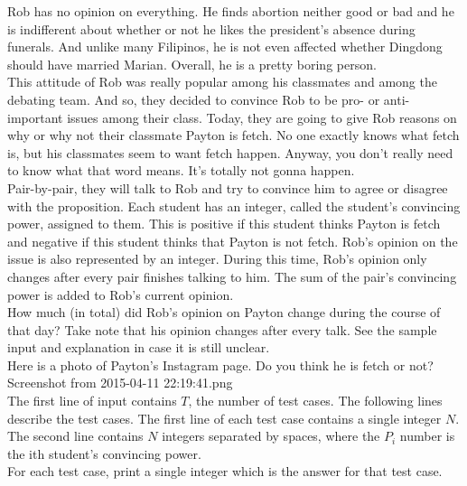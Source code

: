 Rob has no opinion on everything. He finds abortion neither good or bad and he is indifferent about whether or not he likes the president's absence during funerals. And unlike many Filipinos, he is not even affected whether Dingdong should have married Marian. Overall, he is a pretty boring person.\\

This attitude of Rob was really popular among his classmates and among the debating team. And so, they decided to convince Rob to be pro- or anti- important issues among their class. Today, they are going to give Rob reasons on why or why not their classmate Payton is fetch. No one exactly knows what fetch is, but his classmates seem to want fetch happen. Anyway, you don't really need to know what that word means. It's totally not gonna happen.\\

Pair-by-pair, they will talk to Rob and try to convince him to agree or disagree with the proposition. Each student has an integer, called the student's convincing power, assigned to them. This is positive if this student thinks Payton is fetch and negative if this student thinks that Payton is not fetch. Rob's opinion on the issue is also represented by an integer. During this time, Rob's opinion only changes after every pair finishes talking to him. The sum of the pair's convincing power is added to Rob's current opinion.\\

How much (in total) did Rob's opinion on Payton change during the course of that day? Take note that his opinion changes after every talk. See the sample input and explanation in case it is still unclear.\\

Here is a photo of Payton's Instagram page. Do you think he is fetch or not? Screenshot from 2015-04-11 22:19:41.png\\

The first line of input contains $T$, the number of test cases. The following lines describe the test cases. The first line of each test case contains a single integer $N$. The second line contains $N$ integers separated by spaces, where the $P_i$ number is the ith student's convincing power.\\

For each test case, print a single integer which is the answer for that test case.\\